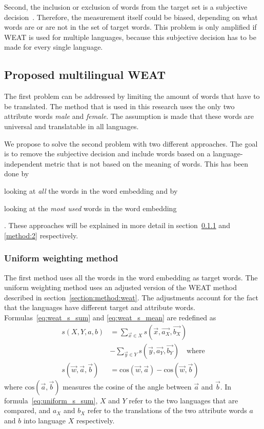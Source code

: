 Second, the inclusion or exclusion of words from
the target set is a subjective decision~\parencite{nissim_fair_is_better_2020}. Therefore,
the measurement itself could be biased, depending on what words are or are not in the set
of target words. This problem is only amplified if WEAT is used for multiple languages,
because this subjective decision has to be made for every single language.

\subsection{Proposed multilingual WEAT}
The first problem can be addressed by limiting the amount of words that have to be
translated. The method that is used in this research uses the only two attribute words 
\textit{male} and \textit{female}. The assumption is made that these words are universal
and translatable in all languages. 

We propose to solve the second problem with two different approaches. The goal is to
remove the subjective decision and include words based on a language-independent metric
that is not based on the meaning of words. This has been done by
\begin{enumerate*}[label={(\alph*)}]
    \item looking at \emph{all} the words in the word embedding and by
    \item looking at the \emph{most used} words in the word embedding
\end{enumerate*}.
These approaches will be explained in more detail in section~\ref{method:1} and
\ref{method:2} respectively.

\subsubsection{Uniform weighting method}
\label{method:1}
The first method uses all the words in the word embedding as target words. 
The uniform weighting method uses an adjusted version of the WEAT method described in
section~\ref{section:method:weat}. The adjustments account for the fact that
the languages have different target and attribute words. Formulas~\eqref{eq:weat_s_sum} and
\eqref{eq:weat_s_mean} are redefined as 
\begin{align} \label{eq:uniform_s_sum}
    s(X,Y,a,b) &= \displaystyle\sum_{\vec{x} \in X} s(\vec{x},\vec{a_X},\vec{b_X})
    \nonumber \\
               &- \displaystyle\sum_{\vec{y} \in Y} s(\vec{y},\vec{a_Y},\vec{b_Y})
    \quad\text{where}\\
\label{eq:uniform_s_mean}
    s(\vec{w},\vec{a},\vec{b}) &= \text{cos}(\vec{w}, \vec{a}) - \text{cos}(\vec{w}, \vec{b})
\end{align}
where $\text{cos}(\vec{a}, \vec{b})$ measures the cosine of the angle between
$\vec{a}$ and $\vec{b}$. 
In formula~\eqref{eq:uniform_s_sum}, $X$ and $Y$ refer to the two languages that are
compared, and $a_X$ and $b_X$ refer to the translations of the
two attribute words $a$ and $b$ into language $X$ respectively. 

